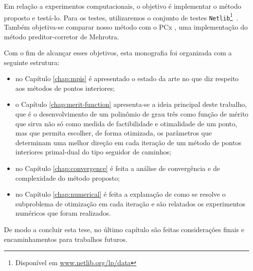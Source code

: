 Em relação a experimentos computacionais, o objetivo é implementar o método proposto e testá-lo. Para os testes, utilizaremos o conjunto de testes \texttt{Netlib}\footnote{Disponível em \url{www.netlib.org/lp/data}}~\cite{Dongarra:1987jk,Gay:1985ts}. Também objetiva-se comparar nosso método com o PCx \cite{Czyzyk:1999hk}, uma implementação do método preditor-corretor de Mehrotra. 



Com o fim de alcançar  esses objetivos, esta monografia foi organizada com a seguinte estrutura: 

\begin{itemize}
	\item no Capítulo \ref{chap:mpis} é apresentado o estado da arte no
que diz respeito aos métodos de pontos interiores; 
\item o Capítulo \ref{chap:merit-function} apresenta-se a ideia principal deste trabalho, que é o
desenvolvimento de um polinômio de grau três como função de mérito  que sirva não só como medida
de factibilidade e otimalidade de um ponto, mas que permita escolher, de forma
otimizada, os parâmetros que determinam uma melhor direção em cada iteração
de um método de pontos interiores primal-dual do tipo seguidor de caminhos; 
\item no Capítulo \ref{chap:convergence} é feita a análise de convergência e de complexidade do método proposto; 
\item no Capítulo \ref{chap:numerical} é feita a explanação de como se resolve o subproblema de otimização em cada iteração e são relatados os experimentos numéricos que foram realizados.


\end{itemize}

 De modo a  concluir esta tese, no último capítulo são feitas considerações finais e encaminhamentos para trabalhos futuros.

